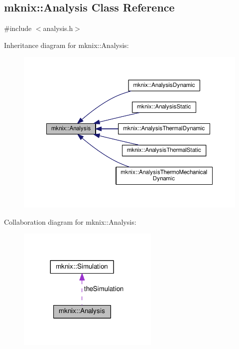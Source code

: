 \hypertarget{classmknix_1_1_analysis}{}\subsection{mknix\+:\+:Analysis Class Reference}
\label{classmknix_1_1_analysis}


{\ttfamily \#include $<$analysis.\+h$>$}



Inheritance diagram for mknix\+:\+:Analysis\+:\nopagebreak
\begin{figure}[H]
\begin{center}
\leavevmode
\includegraphics[width=350pt]{dc/d6f/classmknix_1_1_analysis__inherit__graph}
\end{center}
\end{figure}


Collaboration diagram for mknix\+:\+:Analysis\+:\nopagebreak
\begin{figure}[H]
\begin{center}
\leavevmode
\includegraphics[width=191pt]{d5/d73/classmknix_1_1_analysis__coll__graph}
\end{center}
\end{figure}
